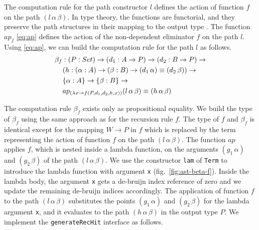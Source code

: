 \documentclass[sigplan,10pt]{acmart}
\begin{document}
The computation rule for the path constructor $l$ defines the action of function $f$ on the path $(l \, \alpha \, \beta)$. In type theory, the functions are functorial, and they preserve the path structures in their mapping to the output type \citep{HoTT-2013}. The function $ap_f$ \eqref{eq:ap} defines the action of the non-dependent eliminator $f$ on the path $l$. Using \eqref{eq:ap}, we can build the computation rule for the path $l$ as follows.
\begin{align}
& \beta_f : (P : Set) \rightarrow (d_1 : A \rightarrow P) \rightarrow (d_2 : B \rightarrow P) \rightarrow \nonumber \\
& \hspace {0.4cm} (h : (\alpha : A) \rightarrow (\beta : B) \rightarrow (d_1 \,  \alpha) \equiv (d_2 \, \beta)) \rightarrow \nonumber \\
& \hspace {0.4cm} \{\alpha : A\} \rightarrow \{\beta : B\} \rightarrow \nonumber \\
& \hspace {0.4cm} ap_{(\lambda x \rightarrow f(P, d_1, d_2, h, x))}(l \, \alpha \, \beta) \equiv (h \, \alpha \, \beta) \nonumber
\end{align}

The computation rule $\beta_f$ exists only as propositional equality. We build the type of $\beta_f$ using the same approach as for the recursion rule $f$. The type of $f$ and $\beta_f$ is identical except for the mapping $W \rightarrow P$ in $f$ which is replaced by the term representing the action of function $f$ on the path $(l \, \alpha \, \beta)$. The function $ap$ applies $f$, which is nested inside a lambda function, on the arguments $(g_1 \, \alpha)$ and $(g_2 \, \beta)$ of the path $(l \, \alpha \, \beta)$. We use the constructor {\tt lam} of {\tt Term} to introduce the lambda function with argument {\tt x} (fig.~\ref{fig:ast-beta-f}). Inside the lambda body, the argument {\tt x} gets a de-bruijn index reference of zero and we update the remaining de-bruijn indices accordingly. The application of function $f$ to the path $(l \, \alpha \, \beta)$ substitutes the points $(g_1 \, \alpha)$ and $(g_2 \, \beta)$ for the lambda argument {\tt x}, and it evaluates to the path $(h \, \alpha \, \beta)$ in the output type $P$. We implement the {\tt generateRecHit} interface as follows. 
\end{document}
